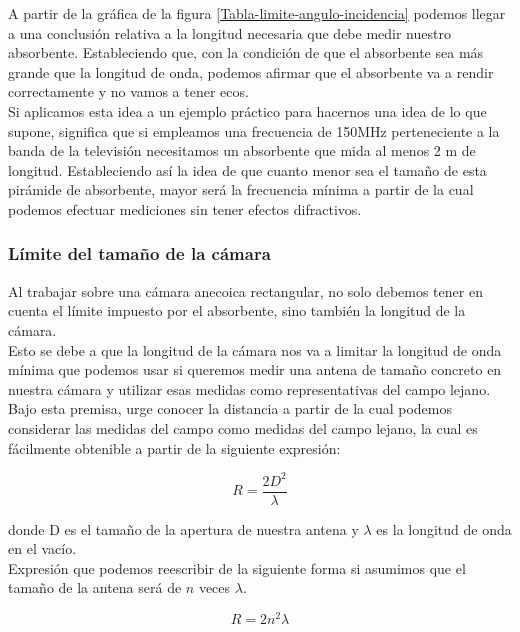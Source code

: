 \documentclass{article}
\begin{document}
A partir de la gráfica de la figura \ref{Tabla-limite-angulo-incidencia} podemos llegar a una conclusión relativa a la longitud necesaria que debe medir nuestro absorbente. Estableciendo que, con la condición de que el absorbente sea más grande que la longitud de onda, podemos afirmar que el absorbente va a rendir correctamente y no vamos a tener ecos.
\\

Si aplicamos esta idea a un ejemplo práctico para hacernos una idea de lo que supone, significa que si empleamos una frecuencia de 150MHz perteneciente a la banda de la televisión necesitamos un absorbente que mida al menos 2 m de longitud. Estableciendo así la idea de que cuanto menor sea el tamaño de esta pirámide de absorbente, mayor será la frecuencia mínima a partir de la cual podemos efectuar mediciones sin tener efectos difractivos. 

\newpage

\subsubsection{Límite del tamaño de la cámara}

Al trabajar sobre una cámara anecoica rectangular, no solo debemos tener en cuenta el límite impuesto por el absorbente, sino también la longitud de la cámara.\\
Esto se debe a que la longitud de la cámara nos va a limitar la longitud de onda mínima que podemos usar si queremos medir una antena de tamaño concreto en nuestra cámara y utilizar esas medidas como representativas del campo lejano.\\ 

Bajo esta premisa, urge conocer la distancia a partir de la cual podemos considerar las medidas del campo como medidas del campo lejano, la cual es fácilmente obtenible a partir de la siguiente expresión: 

                            \begin{equation}
                            R =\frac{2D^2}{\lambda}
                            \end{equation}
                       
donde D es el tamaño de la apertura de nuestra antena y ${\lambda}$ es la longitud de onda en el vacío.\\
Expresión que podemos reescribir de la siguiente forma si asumimos que el tamaño de la antena será de $n$ veces ${\lambda}$.

                            \begin{equation}
                            R =2n^2\lambda
                            \end{equation}
\end{document}
